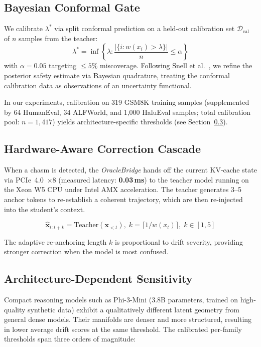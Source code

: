 \documentclass{uai2026}  %
\begin{document}
\subsection{Bayesian Conformal Gate}

We calibrate $\lambda^*$ via split conformal prediction on a held-out
calibration set $\mathcal{D}_\text{cal}$ of $n$ samples from the teacher:
\begin{equation}
  \lambda^* = \inf\!\left\{\lambda :
    \frac{|\{i : w(x_i) > \lambda\}|}{n} \leq \alpha \right\}
  \label{eq:threshold}
\end{equation}
with $\alpha = 0.05$ targeting $\leq 5\%$ miscoverage.
Following Snell et al.~\cite{snell2025conformal}, we refine the
posterior safety estimate via Bayesian quadrature, treating the
conformal calibration data as observations of an uncertainty functional.

In our experiments, calibration on 319 GSM8K training samples
(supplemented by 64 HumanEval, 34 ALFWorld, and 1,000 HaluEval samples;
total calibration pool: $n=1{,}417$)
yields architecture-specific thresholds (see Section~\ref{sec:arch_sensitivity}).

\subsection{Hardware-Aware Correction Cascade}

When a chasm is detected, the \emph{OracleBridge} hands off the
current KV-cache state via PCIe~4.0~$\times$8 (measured latency:
\textbf{0.03\,ms}) to the teacher model running on the Xeon W5 CPU
under Intel AMX acceleration.
The teacher generates 3--5 anchor tokens to re-establish a coherent
trajectory, which are then re-injected into the student's context.

\begin{equation}
  \hat{\mathbf{x}}_{t:t+k} = \text{Teacher}(\mathbf{x}_{<t}),\;
  k = \lceil 1 / w(x_t) \rceil,\; k\in[1,5]
  \label{eq:reanchor}
\end{equation}

The adaptive re-anchoring length $k$ is proportional to drift severity,
providing stronger correction when the model is most confused.

\subsection{Architecture-Dependent Sensitivity}
\label{sec:arch_sensitivity}

Compact reasoning models such as Phi-3-Mini (3.8B parameters, trained
on high-quality synthetic data) exhibit a qualitatively different latent
geometry from general dense models.
Their manifolds are denser and more structured, resulting in lower
average drift scores at the same threshold.
The calibrated per-family thresholds span three orders of magnitude:
\end{document}
